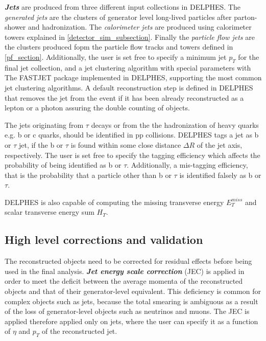 {\emph{\bf{Jets}} are produced from three different input collections in DELPHES. The \emph{generated jets} are the clusters of generator level long-lived particles after parton- shower and hadronization. The \emph{calorimeter jets} are produced using calorimeter towers explained in \autoref{detector_sim_subsection}. Finally the \emph{particle flow jets} are the clusters produced fopm the particle flow tracks and towers defined in \autoref{pf_section}. Additionally, the user is set free to specify a minimum jet $p_T$ for the final jet collection, and a jet clustering algorithm with special parameters with The FASTJET package \cite{Cacciari2012} implemented in DELPHES, supporting the most common jet clustering algorithms. A default reconstruction step is defined in DELPHES that removes the jet from the event if it has been already reconstructed as a lepton or a photon assuring the double counting of objects.

The jets originating from $\tau$ decays or from the the hadronization of heavy quarks e.g. b or c quarks, should be identified in pp collisions. DELPHES tags a jet as b or $\tau$ jet, if the b or $\tau$ is found within some close distance $\Delta R$ of the jet axis, respectively. The user is set free to specify the tagging efficiency which affects the probability of being identified as b or $\tau$. Additionally, a mis-tagging efficiency, that is the probability that a particle other than b or $\tau$ is identified falsely as b or $\tau$.

DELPHES is also capable of computing the missing transverse energy $E_T^{miss}$ and scalar transverse energy sum $H_T$.

\subsection{High level corrections and validation}

The reconstructed objects need to be corrected for residual effects before being used in the final analysis. \emph{\bf{Jet energy scale correction}} (JEC) is applied in order to meet the deficit between the average momenta of the reconstructed objects and that of their generator-level equivalent. This deficiency is common for complex objects such as jets, because the total smearing is ambiguous as a result of the loss of generator-level objects such as neutrinos and muons. The JEC is applied therefore applied only on jets, where the user can specify it as a function of $\eta$ and $p_T$ of the reconstructed jet.

}
